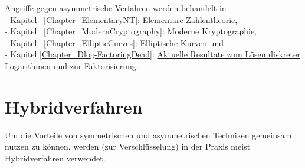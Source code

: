 \begin{refsegment}
Angriffe gegen asymmetrische Verfahren werden behandelt in\\
- Kapitel~ \ref{Chapter_ElementaryNT}: \hyperlink{Chapter_ElementaryNT}{Elementare Zahlentheorie},\\
- Kapitel~ \ref{Chapter_ModernCryptography}:
  \hyperlink{Chapter_ModernCryptography}{Moderne Kryptographie},\\
- Kapitel~ \ref{Chapter_EllipticCurves}:
  \hyperlink{Chapter_EllipticCurves}{Elliptische Kurven} und\\
- Kapitel \ref{Chapter_Dlog-FactoringDead}: \hyperlink{Chapter_Dlog-FactoringDead}
  {Aktuelle Resultate zum Lösen diskreter Logarithmen und zur Faktorisierung}.



\section[Hybridverfahren]{Hybridverfahren\footnotemark}
\label{CM_Hybrid-procedures}

Um die Vorteile von symmetrischen und asymmetrischen Techniken gemeinsam
nutzen zu können, werden (zur Verschlüsselung) in der Praxis meist
Hybridverfahren  verwendet.


\end{refsegment}
